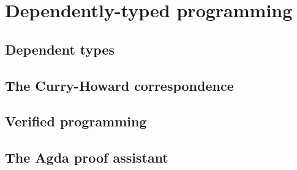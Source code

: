 \chapter{Dependently-typed programming}

\section{Dependent types}

\section{The Curry-Howard correspondence}

\section{Verified programming}

\section{The Agda proof assistant}
